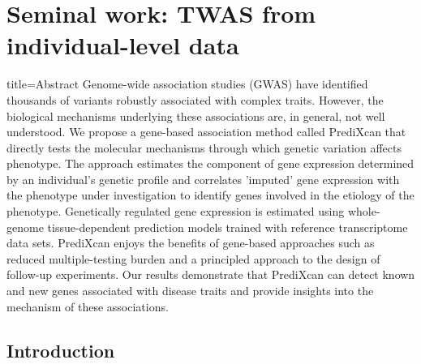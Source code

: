 \documentclass[../main.tex]{subfiles}
\begin{document}
\chapter{Seminal work: TWAS from individual-level data}

\begin{external_abstract}{title=Abstract}
Genome-wide association studies (GWAS) have identified thousands of 
variants robustly associated with complex traits. However, the 
biological mechanisms underlying these associations are, in general, not 
well understood. We propose a gene-based association method called 
PrediXcan that directly tests the molecular mechanisms through which 
genetic variation affects phenotype. The approach estimates the 
component of gene expression determined by an individual's genetic 
profile and correlates 'imputed' gene expression with the phenotype 
under investigation to identify genes involved in the etiology of the 
phenotype. Genetically regulated gene expression is estimated using 
whole-genome tissue-dependent prediction models trained with reference 
transcriptome data sets. PrediXcan enjoys the benefits of gene-based 
approaches such as reduced multiple-testing burden and a principled 
approach to the design of follow-up experiments. Our results demonstrate 
that PrediXcan can detect known and new genes associated with disease 
traits and provide insights into the mechanism of these associations.
\end{external_abstract}

\section{Introduction}
\end{document}
